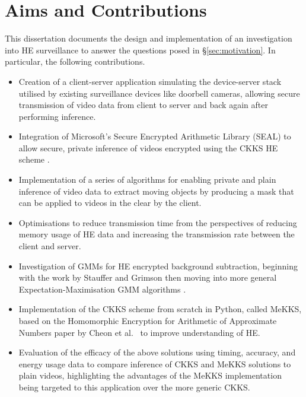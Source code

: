 \setlength{\leftskip}{0cm}


\section{Aims and Contributions}
\label{sec:aimsAndContributions}
\setlength{\leftskip}{0.25cm}
\indent \indent
This dissertation documents the design and implementation of an investigation into HE surveillance to answer the questions posed in §\ref{sec:motivation}. In particular, the following contributions.
\begin{itemize}
    \item Creation of a client-server application simulating the device-server stack utilised by existing surveillance devices like doorbell cameras, allowing secure transmission of video data from client to server and back again after performing inference.
    \item Integration of Microsoft's Secure Encrypted Arithmetic Library (SEAL) \cite{SEAL} to allow secure, private inference of videos encrypted using the CKKS HE scheme \cite{CKKS}.
    \item Implementation of a series of algorithms for enabling private and plain inference of video data to extract moving objects by producing a mask that can be applied to videos in the clear by the client.
    \item Optimisations to reduce transmission time from the perspectives of reducing memory usage of HE data and increasing the transmission rate between the client and server.
    \item Investigation of GMMs for HE encrypted background subtraction, beginning with the work by Stauffer and Grimson \cite{Stauffer} then moving into more general Expectation-Maximisation GMM algorithms \cite{Dempster}.
    \item Implementation of the CKKS scheme from scratch in Python, called MeKKS, based on the Homomorphic Encryption for Arithmetic of Approximate Numbers paper by Cheon et al.\ \cite{CKKS, BootstrappingHEAAN} to improve understanding of HE.
    \item Evaluation of the efficacy of the above solutions using timing, accuracy, and energy usage data to compare inference of CKKS and MeKKS solutions to plain videos, highlighting the advantages of the MeKKS implementation being targeted to this application over the more generic CKKS.
\end{itemize}

\setlength{\leftskip}{0cm}
